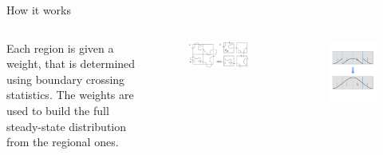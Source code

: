 \documentclass[final]{beamer}
\begin{document}
\begin{columns}[t]
\begin{column}{.25 \linewidth}
\begin{block}{How it works}
	  \begin{columns}[t]
	    \begin{column}{.4\linewidth}
	      Each region is given a weight, that is determined using boundary crossing statistics.
	      The weights are used to build the full steady-state distribution from the regional ones.
	    \end{column}
	    \begin{column}{.25\linewidth}
	      \begin{figure}
		\includegraphics[width=3 in]{images/motivation2.pdf}
	      \end{figure}
	    \end{column}
	    \begin{column}{.25\linewidth}
	      \begin{figure}
		\includegraphics[width=2 in]{images/patch.pdf}
	      \end{figure}
	    \end{column}
	  \end{columns}

        \end{block}

      \end{column}


\end{columns}
\end{document}
